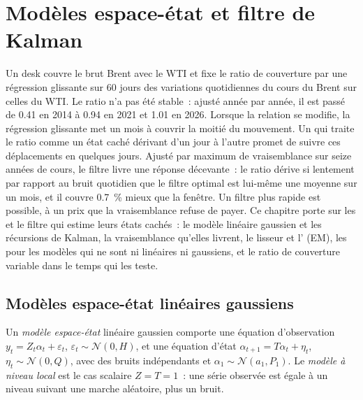\chapter{Modèles espace-état et filtre de Kalman}\label{ch:qm:state-space-models-and-the-kalman-filter}

Un desk couvre le brut Brent avec le WTI et fixe le ratio de couverture par une régression glissante sur 60 jours des variations quotidiennes du cours du Brent sur celles du WTI. Le ratio
n'a pas été stable~: ajusté année par année, il est passé de 0.41 en 2014 à 0.94 en 2021 et 1.01 en 2026. Lorsque la relation se modifie, la régression glissante
met un mois à couvrir la moitié du mouvement. Un  qui traite le ratio comme un état caché dérivant d'un jour à l'autre promet de
suivre ces déplacements en quelques jours. Ajusté par maximum de vraisemblance sur seize années de cours, le filtre livre une réponse décevante~: le ratio dérive si lentement
par rapport au bruit quotidien que le filtre optimal est lui-même une moyenne sur un mois, et il couvre 0.7~\% mieux que la fenêtre. Un filtre plus rapide
est possible, à un prix que la vraisemblance refuse de payer. Ce chapitre porte sur les  et le filtre qui estime leurs
états cachés~: le modèle linéaire gaussien et les récursions de Kalman, la vraisemblance qu'elles livrent, le lisseur et l' (EM), les  pour
les modèles qui ne sont ni linéaires ni gaussiens, et le ratio de couverture variable dans le temps qui les teste.

\section{Modèles espace-état linéaires gaussiens}

\begin{definition}\label{def:qm:state-space-models-and-the-kalman-filter:ssm}
Un \emph{modèle espace-état} linéaire gaussien comporte une équation d'observation $y_t = Z_t\alpha_t + \varepsilon_t$, $\varepsilon_t \sim \mathcal N(0,
H)$, et une équation d'état $\alpha_{t+1} = T\alpha_t + \eta_t$, $\eta_t \sim \mathcal N(0, Q)$, avec des bruits indépendants et $\alpha_1 \sim \mathcal N(a_1, P_1)$. Le
\emph{modèle à niveau local} est le cas scalaire $Z = T = 1$~: une série observée est égale à un niveau suivant une marche aléatoire, plus un bruit.
\end{definition}

